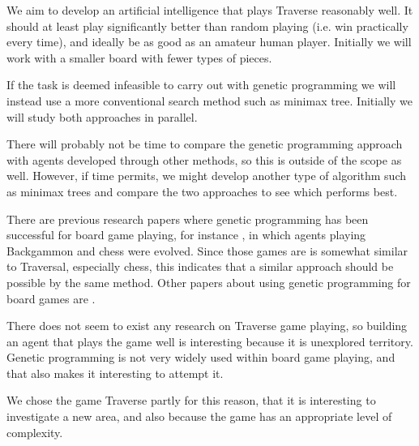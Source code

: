 \documentclass[times, 10pt,twocolumn]{article}
\begin{document}


We aim to develop an artificial intelligence that plays Traverse reasonably well. It should at least play significantly better than random playing (i.e. win practically every time), and ideally be as good as an amateur human player. Initially we will work with a smaller board with fewer types of pieces.

If the task is deemed infeasible to carry out with genetic programming we will instead use a more conventional search method such as minimax tree. Initially we will study both approaches in parallel.


There will probably not be time to compare the genetic programming approach with agents developed through other methods, so this is outside of the scope as well. However, if time permits, we might develop another type of algorithm such as minimax trees and compare the two approaches to see which performs best.


There are previous research papers where genetic programming has been successful for board game playing, for instance \cite{human-competitive_gp}, in which agents playing Backgammon and chess were evolved. Since those games are is somewhat similar to Traversal, especially chess, this indicates that a similar approach should be possible by the same method. Other papers about using genetic programming for board games are \cite{ mancala, othello}.


There does not seem to exist any research on Traverse game playing, so building an agent that plays the game well is interesting because it is unexplored territory. Genetic programming is not very widely used within board game playing, and that also makes it interesting to attempt it.

We chose the game Traverse partly for this reason, that it is interesting to investigate a new area, and also because the game has an appropriate level of complexity.
\end{document}
